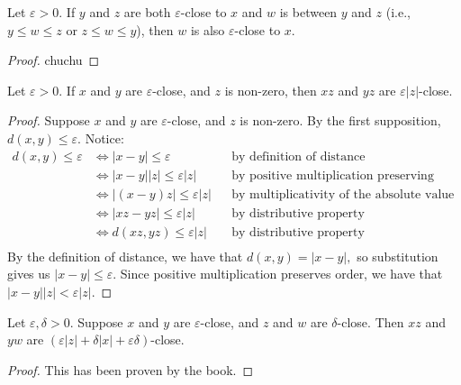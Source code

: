\begin{proposition}
    Let $\varepsilon > 0.$ If $y$ and $z$ are both $\varepsilon$-close to $x$ and $w$ is between $y$ and $z$ (i.e., $y \leq w \leq z$ or $z \leq w \leq y$), then $w$ is also $\varepsilon$-close to $x$.
\end{proposition}
\begin{proof}
    chuchu
\end{proof}

\begin{proposition}
    Let $\varepsilon > 0.$ If $x$ and $y$ are $\varepsilon$-close, and $z$ is non-zero, then $xz$ and $yz$ are $\varepsilon \lvert z \rvert$-close.
\end{proposition}
\begin{proof}
    Suppose $x$ and $y$ are $\varepsilon$-close, and $z$ is non-zero.
    By the first supposition, $d(x, y) \leq \varepsilon.$ Notice:
    \begin{align*}
        d(x, y) \leq \varepsilon &\iff \lvert x - y \rvert \leq \varepsilon &&\text{by definition of distance} \\
        &\iff \lvert x - y \rvert \lvert z \rvert \leq \varepsilon \lvert z \rvert &&\text{by positive multiplication preserving order} \\
        &\iff \lvert (x - y) z \rvert \leq \varepsilon \lvert z \rvert &&\text{by multiplicativity of the absolute value} \\
        &\iff \lvert xz - yz \rvert \leq \varepsilon \lvert z \rvert &&\text{by distributive property} \\
        &\iff d(xz, yz) \leq \varepsilon \lvert z \rvert &&\text{by distributive property} \\
    \end{align*}
    By the definition of distance, we have that $d(x, y) = \lvert x - y \rvert,$
    so substitution gives us $\lvert x -  y \rvert \leq \varepsilon.$
    Since positive multiplication preserves order, we have that $\lvert x - y \rvert \lvert z \rvert < \varepsilon \lvert z \rvert$.
\end{proof}

\begin{proposition}
    Let $\varepsilon, \delta > 0.$ Suppose $x$ and $y$ are $\varepsilon$-close, and $z$ and $w$ are $\delta$-close. Then $xz$ and $yw$ are $(\varepsilon \lvert z \rvert + \delta \lvert x \rvert + \varepsilon \delta)$-close.
\end{proposition}
\begin{proof}
    This has been proven by the book.
\end{proof}

